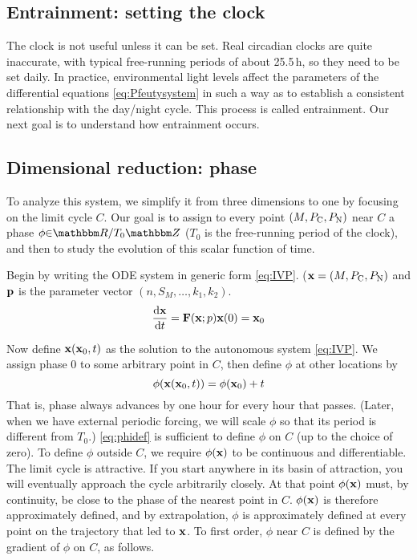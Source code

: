 \documentclass[10pt,letter, swedish, english,%
]{article}
\begin{document}
\subsection{Entrainment: setting the clock}
The clock is not useful unless it can be set. Real circadian clocks
are quite inaccurate, with typical free-running periods of about
25.5\,h, so they need to be set daily. In practice, environmental
light levels affect the parameters of the differential equations \eqref{eq:Pfeutysystem} in
such a way as to establish a consistent relationship with the
day/night cycle. This process is called entrainment. Our next goal is
to understand how entrainment occurs. 

\subsection{Dimensional reduction: phase}
To analyze this system, we simplify it from three dimensions to one by
focusing on the limit cycle  $C$. Our goal is to assign to every
point  $(M,P_{\text{C}},P_{\text{N}})$ near  $C$ a phase  $\phi{\in}\R/{T}_{0}\Z$
(${T}_{0}$ is the free-running period of the clock), and then to study
the evolution of this scalar function of time. 

Begin by writing the ODE system in generic form
\eqref{eq:IVP}. ($\vb{x}=(M,P_{\text{C}},P_{\text{N}})$ and $\vb{p}$ is the parameter vector
$(n,{S}_{M},{\dots},{k}_{1},{k}_{2})$.  
\begin{equation}\label{eq:IVP}
\dv{\vb{x}}{t}=\vb{F}(\vb{x};p)
\vb{x}(0)={\vb{x}}_{0}
\end{equation}

Now define  $\vb{x}({\vb{x}}_{0},t)$ as the solution to the autonomous system
\eqref{eq:IVP}. We assign phase 0 to some arbitrary point in  $C$, then define 
$\phi$ at other locations by 
\begin{equation}\label{eq:phidef}
\phi (\vb{x}({\vb{x}}_{0},t))=\phi
({\vb{x}}_{0})+t
\end{equation}
That is, phase always advances by one hour for every hour that passes.
(Later, when we have external periodic forcing, we will scale 
$\phi$ so that its period is different from  ${T}_{0}$.) \eqref{eq:phidef} is
sufficient to define  $\phi$ on  $C$ (up to the choice of zero).
To define  $\phi$ outside  $C$, we require  $\phi(\vb{x})$ to be
continuous and differentiable. The limit cycle is attractive. If you
start anywhere in its basin of attraction, you will eventually
approach the cycle arbitrarily closely. At that point  $\phi(\vb{x})$
must, by continuity, be close to the phase of the nearest point in 
$C$.  $\phi(\vb{x})$ is therefore approximately defined, and by
extrapolation,  $\phi$ is approximately defined at every point on
the trajectory that led to  $\vb{x}$. To first order,  $\phi$ near 
$C$ is defined by the gradient of  $\phi$ on  $C$, as follows. 
\end{document}
